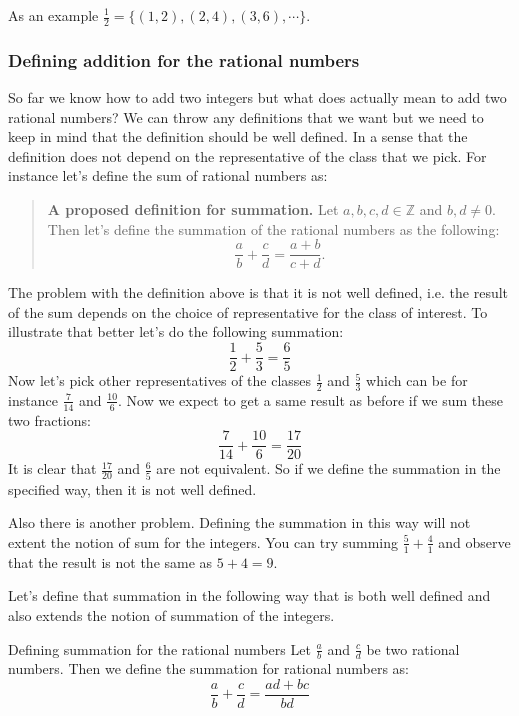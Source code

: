 As an example $ \frac{1}{2} = \{ (1,2), (2,4), (3,6), \cdots \} $.

\subsubsection{Defining addition for the rational numbers}
So far we know how to add two integers but what does actually mean to add two rational numbers? We can throw any definitions that we want but we need to keep in mind that the definition should be well defined. In a sense that the definition does not depend on the representative of the class that we pick. For instance let's define the sum of rational numbers as:

\begin{quote}
	\textbf{A proposed definition for summation.} Let $ a,b,c,d \in \mathbb{Z} $ and $ b,d \neq 0 $. Then let's define the summation of the rational numbers as the following:
	\[ \frac{a}{b} + \frac{c}{d} = \frac{a+b}{c+d}.  \]
\end{quote}

The problem with the definition above is that it is not well defined, i.e. the result of the sum depends on the choice of representative for the class of interest. To illustrate that better let's do the following summation:
\[ \frac{1}{2} + \frac{5}{3} = \frac{6}{5} \]
Now let's pick other representatives of the classes $ \frac{1}{2} $ and $ \frac{5}{3} $ which can be for instance $ \frac{7}{14} $ and $ \frac{10}{6} $. Now we expect to get a same result as before if we sum these two fractions:
\[ \frac{7}{14} + \frac{10}{6} = \frac{17}{20}  \]
It is clear that $ \frac{17}{20} $ and $ \frac{6}{5} $ are not equivalent. So if we define the summation in the specified way, then it is not well defined. 

Also there is another problem. Defining the summation in this way will not extent the notion of sum for the integers. You can try summing $ \frac{5}{1} + \frac{4}{1} $ and observe that the result is not the same as $ 5+4=9 $.

Let's define that summation in the following way that is both well defined and also extends the notion of summation of the integers. 

\begin{defbox}{Defining summation for the rational numbers}
	Let $ \frac{a}{b} $ and $ \frac{c}{d} $ be two rational numbers. Then we define the summation for rational numbers as:
	\[ \frac{a}{b} + \frac{c}{d} = \frac{ad + bc}{bd} \]
\end{defbox}

